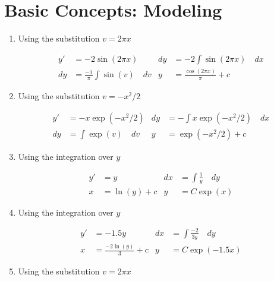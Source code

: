 \section{Basic Concepts: Modeling}

\begin{enumerate}
    \item Using the substitution $v = 2 \pi x$

          \begin{align}
              y' & = -2 \sin(2 \pi x)                     &
              dy & = -2 \int \sin(2 \pi x) \quad dx         \\
              dy & = \frac{-1}{\pi} \int \sin(v) \quad dv &
              y  & = \frac{\cos(2\pi x)}{\pi} + c
          \end{align}


    \item Using the substitution $v = -x^{2} / 2$

          \begin{align}
              y' & = -x \exp(-x^{2} / 2)                &
              dy & = - \int x \exp(-x^{2} / 2) \quad dx   \\
              dy & = \int \exp(v) \quad dv              &
              y  & = \exp(-x^{2} / 2) + c
          \end{align}


    \item Using the integration over $y$

          \begin{align}
              y' & = y                         &
              dx & = \int \frac{1}{y} \quad dy   \\
              x  & = \ln(y) + c                &
              y  & = C\exp(x)
          \end{align}


    \item Using the integration over $y$

          \begin{align}
              y' & = -1.5 y                      &
              dx & = \int \frac{-2}{3y} \quad dy   \\
              x  & = \frac{-2 \ln(y)}{3} + c     &
              y  & = C\exp(-1.5x)
          \end{align}


    \item Using the substitution $v = 2 \pi x$


\end{enumerate}
